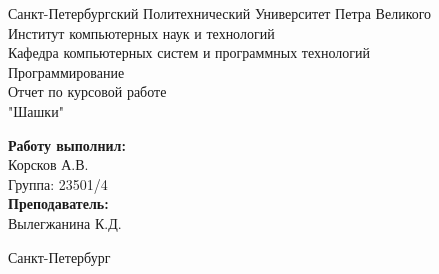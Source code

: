 \documentclass[a4paper]{article}
\begin{document}


\begin{titlepage}	%

	\begin{center}		%

		\large Санкт-Петербургский Политехнический Университет Петра Великого\\
		\large Институт компьютерных наук и технологий \\
		\large Кафедра компьютерных систем и программных технологий\\[6cm]
		
		\huge Программирование\\[0.5cm] %
		\large Отчет по курсовой работе\\[0.1cm]
		\large "Шашки"\\[5cm]

	\end{center}


	\begin{flushright} %
		\begin{minipage}{0.25\textwidth} %
			\begin{flushleft} %

				\large\textbf{Работу выполнил:}\\
				\large Корсков А.В.\\
				\large {Группа:} 23501/4\\
				
				\large \textbf{Преподаватель:}\\
				\large Вылегжанина К.Д.
				

			\end{flushleft}
		\end{minipage}
	\end{flushright}
	
	\vfill %

	\begin{center}
	\large Санкт-Петербург\\
	\large \the\year %
	\end{center} %

\thispagestyle{empty} %
\end{titlepage} %
\end{document}
